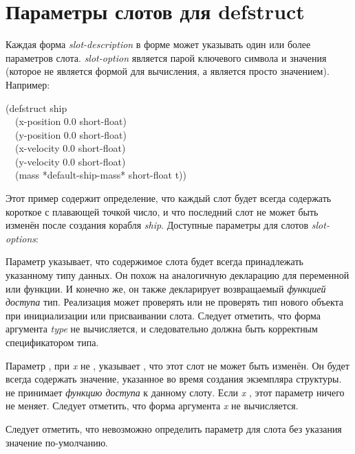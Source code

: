 \section{Параметры слотов для defstruct}
\label{Defstruct-Slot-Options}

Каждая форма \emph{slot-description} в форме  может указывать
один или более параметров слота. \emph{slot-option} является парой ключевого
символа и значения (которое не является формой для вычисления, а является просто
значением).  Например:
\begin{lisp}
(defstruct ship \\
~~(x-position 0.0  short-float) \\
~~(y-position 0.0  short-float) \\
~~(x-velocity 0.0  short-float) \\
~~(y-velocity 0.0  short-float) \\
~~(mass *default-ship-mass*  short-float  t))
\end{lisp}
Этот пример содержит определение, что каждый слот будет всегда содержать
короткое с плавающей точкой число, и что последний слот не может быть изменён
после создания корабля \emph{ship}.
Доступные параметры для слотов \emph{slot-options}:
\begin{flushdesc}
\item[\cd{:type}] Параметр  указывает, что содержимое
  слота будет всегда принадлежать указанному типу данных. Он похож на
  аналогичную декларацию для переменной или функции. И конечно же, он также
  декларирует возвращаемый \emph{функцией доступа} тип. Реализация может
  проверять или не проверять тип нового объекта при инициализации или
  присваивании слота.  Следует отметить, что форма аргумента \emph{type} не
  вычисляется, и следовательно должна быть корректным спецификатором типа.

\item[\cd{:read-only}] Параметр , при \emph{x} не
  {\false}, указывает , что этот слот не может быть изменён. Он будет всегда
  содержать значение, указанное во время создания экземпляра структуры.
   не принимает \emph{функцию доступа} к данному слоту.  Если \emph{x}
  {\false}, этот параметр ничего не меняет.  Следует отметить, что форма
  аргумента \emph{x} не вычисляется.
\end{flushdesc}

Следует отметить, что невозможно определить параметр для слота без указания
значение по-умолчанию.

